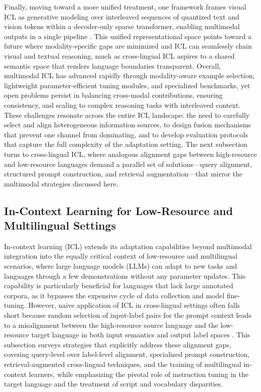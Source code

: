 \documentclass[11pt]{article}
\begin{document}
Finally, moving toward a more unified treatment, one framework frames visual ICL as generative modeling over interleaved sequences of quantized text and vision tokens within a decoder-only sparse transformer, enabling multimodal outputs in a single pipeline \cite{ref126}. This unified representational space points toward a future where modality-specific gaps are minimized and ICL can seamlessly chain visual and textual reasoning, much as cross-lingual ICL aspires to a shared semantic space that renders language boundaries transparent. Overall, multimodal ICL has advanced rapidly through modality-aware example selection, lightweight parameter-efficient tuning modules, and specialized benchmarks, yet open problems persist in balancing cross-modal contributions, ensuring consistency, and scaling to complex reasoning tasks with interleaved context. These challenges resonate across the entire ICL landscape: the need to carefully select and align heterogeneous information sources, to design fusion mechanisms that prevent one channel from dominating, and to develop evaluation protocols that capture the full complexity of the adaptation setting. The next subsection turns to cross-lingual ICL, where analogous alignment gaps between high-resource and low-resource languages demand a parallel set of solutions---query alignment, structured prompt construction, and retrieval augmentation---that mirror the multimodal strategies discussed here.

\subsection{In-Context Learning for Low-Resource and Multilingual Settings}

In-context learning (ICL) extends its adaptation capabilities beyond multimodal integration into the equally critical context of low-resource and multilingual scenarios, where large language models (LLMs) can adapt to new tasks and languages through a few demonstrations without any parameter updates. This capability is particularly beneficial for languages that lack large annotated corpora, as it bypasses the expensive cycle of data collection and model fine-tuning. However, naive application of ICL in cross-lingual settings often falls short because random selection of input-label pairs for the prompt context leads to a misalignment between the high-resource source language and the low-resource target language in both input semantics and output label spaces \cite{ref127}. This subsection surveys strategies that explicitly address these alignment gaps, covering query-level over label-level alignment, specialized prompt construction, retrieval-augmented cross-lingual techniques, and the training of multilingual in-context learners, while emphasizing the pivotal role of instruction tuning in the target language and the treatment of script and vocabulary disparities.
\end{document}
